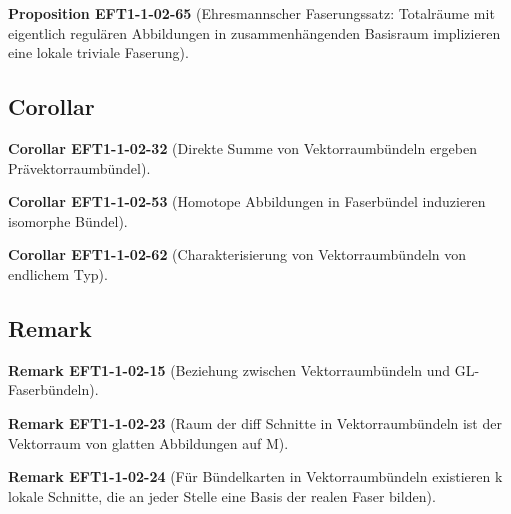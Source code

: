 \documentclass[10pt, letterpaper]{article}
\newcommand{\CustomHeading}[3]{%
  \par\medskip\noindent%
  \textbf{#1 #2} \textnormal{(#3)}.\enskip%
}
\newenvironment{PROP}[2]{\CustomHeading{Proposition}{#1}{#2}}{}
\newenvironment{KORO}[2]{\CustomHeading{Corollar}{#1}{#2}}{}
\newenvironment{REM}[2]{\CustomHeading{Remark}{#1}{#2}}{}
\begin{document}
\begin{PROP}{EFT1-1-02-65}{Ehresmannscher Faserungssatz: Totalräume mit eigentlich regulären Abbildungen in zusammenhängenden Basisraum implizieren eine lokale triviale Faserung}

\end{PROP}












\subsection{Corollar}

\begin{KORO}{EFT1-1-02-32}{Direkte Summe von Vektorraumbündeln ergeben Prävektorraumbündel}

\end{KORO}

\begin{KORO}{EFT1-1-02-53}{Homotope Abbildungen in Faserbündel induzieren isomorphe Bündel}

\end{KORO}

\begin{KORO}{EFT1-1-02-62}{Charakterisierung von Vektorraumbündeln von endlichem Typ}

\end{KORO}










\subsection{Remark}

\begin{REM}{EFT1-1-02-15}{Beziehung zwischen Vektorraumbündeln und GL-Faserbündeln}

\end{REM}

\begin{REM}{EFT1-1-02-23}{Raum der diff Schnitte in Vektorraumbündeln ist der Vektorraum von glatten Abbildungen auf M}

\end{REM}

\begin{REM}{EFT1-1-02-24}{Für Bündelkarten in Vektorraumbündeln existieren k lokale Schnitte, die an jeder Stelle eine Basis der realen Faser bilden}

\end{REM}
\end{document}
